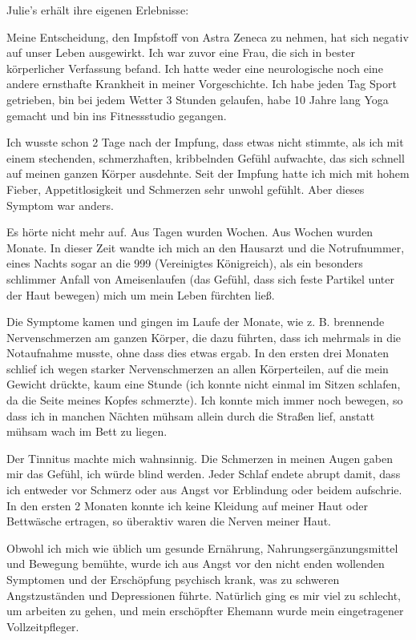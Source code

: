 Julie’s erhält ihre eigenen Erlebnisse:

Meine Entscheidung, den Impfstoff von Astra Zeneca zu nehmen, hat sich negativ
auf unser Leben ausgewirkt. Ich war zuvor eine Frau, die sich in bester
körperlicher Verfassung befand. Ich hatte weder eine neurologische noch eine
andere ernsthafte Krankheit in meiner Vorgeschichte. Ich habe jeden Tag Sport
getrieben, bin bei jedem Wetter 3 Stunden gelaufen, habe 10 Jahre lang Yoga
gemacht und bin ins Fitnessstudio gegangen.

Ich wusste schon 2 Tage nach der Impfung, dass etwas nicht stimmte, als ich mit
einem stechenden, schmerzhaften, kribbelnden Gefühl aufwachte, das sich schnell
auf meinen ganzen Körper ausdehnte. Seit der Impfung hatte ich mich mit hohem
Fieber, Appetitlosigkeit und Schmerzen sehr unwohl gefühlt. Aber dieses Symptom
war anders.

Es hörte nicht mehr auf. Aus Tagen wurden Wochen. Aus Wochen wurden Monate. In
dieser Zeit wandte ich mich an den Hausarzt und die Notrufnummer, eines Nachts
sogar an die 999 (Vereinigtes Königreich), als ein besonders schlimmer Anfall
von Ameisenlaufen (das Gefühl, dass sich feste Partikel unter der Haut bewegen)
mich um mein Leben fürchten ließ.

Die Symptome kamen und gingen im Laufe der Monate, wie z. B. brennende
Nervenschmerzen am ganzen Körper, die dazu führten, dass ich mehrmals in die
Notaufnahme musste, ohne dass dies etwas ergab. In den ersten drei Monaten
schlief ich wegen starker Nervenschmerzen an allen Körperteilen, auf die mein
Gewicht drückte, kaum eine Stunde (ich konnte nicht einmal im Sitzen schlafen,
da die Seite meines Kopfes schmerzte). Ich konnte mich immer noch bewegen, so
dass ich in manchen Nächten mühsam allein durch die Straßen lief, anstatt mühsam
wach im Bett zu liegen.

Der Tinnitus machte mich wahnsinnig. Die Schmerzen in meinen Augen gaben mir das
Gefühl, ich würde blind werden. Jeder Schlaf endete abrupt damit, dass ich
entweder vor Schmerz oder aus Angst vor Erblindung oder beidem aufschrie. In den
ersten 2 Monaten konnte ich keine Kleidung auf meiner Haut oder Bettwäsche
ertragen, so überaktiv waren die Nerven meiner Haut.

Obwohl ich mich wie üblich um gesunde Ernährung, Nahrungsergänzungsmittel und
Bewegung bemühte, wurde ich aus Angst vor den nicht enden wollenden Symptomen
und der Erschöpfung psychisch krank, was zu schweren Angstzuständen und
Depressionen führte. Natürlich ging es mir viel zu schlecht, um arbeiten zu
gehen, und mein erschöpfter Ehemann wurde mein eingetragener Vollzeitpfleger.

